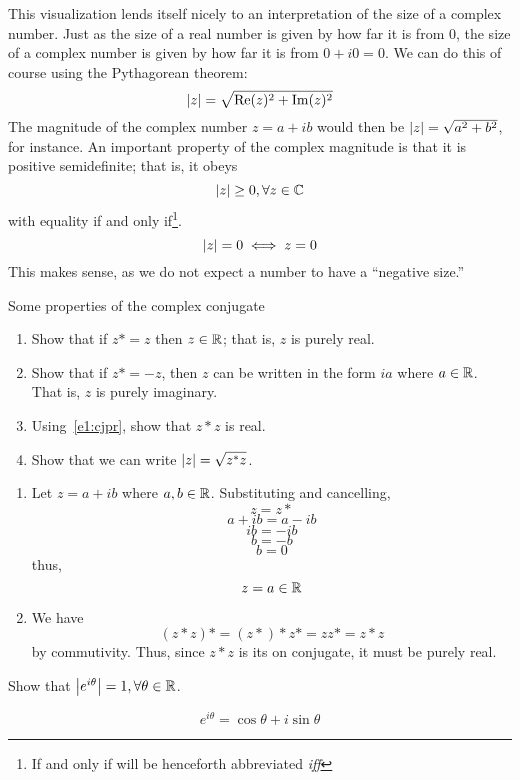 This visualization lends itself nicely to an interpretation of the size of a complex number. Just as the size of a real number is given by how far it is from 0, the size of a complex number is given by how far it is from \(0+i0 = 0\). We can do this of course using the Pythagorean theorem:
\begin{equation}
	\left|z\right| = \sqrt{\operatorname{Re}(z)^2+\operatorname{Im}(z)^2}
\end{equation}
The magnitude of the complex number \(z=a+ib\) would then be \(\left|z\right| = \sqrt{a^2+b^2}\), for instance. An important property of the complex magnitude is that it is positive semidefinite; that is, it obeys
\begin{equation}
	\left|z\right| \geq 0, \forall z\in\mathbb{C}
\end{equation}
with equality if and only if\footnote{If and only if will be henceforth abbreviated \emph{iff}}.
\begin{equation}
	\left|z\right| = 0 \iff z = 0
\end{equation}
This makes sense, as we do not expect a number to have a ``negative size.'' 
\begin{exercise}
	Some properties of the complex conjugate
	\begin{enumerate}[label = (\alph*)]
		\item\label{e1:cjpr} Show that if \(z\ast = z\) then \(z\in \mathbb{R}\); that is, \(z\) is purely real.
		\item Show that if \(z\ast = -z\), then \(z\) can be written in the form \(ia\) where \(a\in\mathbb{R}\). That is, \(z\) is purely imaginary.
		\item Using~\ref{e1:cjpr}, show that \(z\ast z\) is real.
		\item Show that we can write \(\abs{z} = \sqrt{z\ast z}\).
	\end{enumerate}
\begin{solution}
	\begin{enumerate}[label = (\alph*)]
		\item Let \(z = a+ib\) where \(a,b\in\mathbb{R}\). Substituting and cancelling,
			\[z=z\ast\]
			\[a+ib = a-ib\]
			\[ib = -ib\]
			\[b = -b\]
			\[b=0\]
			thus,
			\[z = a\in\mathbb{R}\]
		\item We have
			\[(z\ast z)\ast = (z\ast)\ast z\ast = zz\ast = z\ast z\]
			by commutivity. Thus, since \(z\ast z\) is its on conjugate, it must be purely real.
	\end{enumerate}
\end{solution}
\end{exercise}
\begin{exercise}
	Show that \(\left|e^{i\theta}\right| = 1,\forall \theta\in\mathbb{R}\).
\begin{solution}
	\[e^{i\theta} = \cos\theta + i\sin\theta\]
\end{solution}
\end{exercise}
